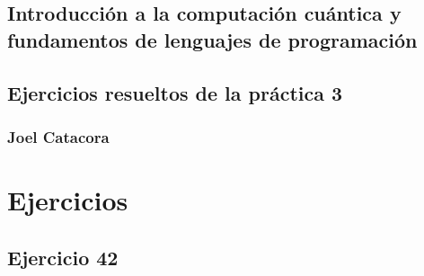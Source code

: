 \documentclass[a4paper,11pt]{article}
\title{}
\author{}
\begin{document}
\maketitle 

\thispagestyle{empty}
\begin{center}
\section*{Introducción a  la computación cuántica y fundamentos de lenguajes de programación} 
\subsection*{Ejercicios resueltos de la práctica 3}
\subsubsection*{Joel Catacora}

\end{center}

\newpage{\pagestyle{empty}\cleardoublepage}

\newpage

\section*
{Ejercicios}

\subsection*{Ejercicio 42}
\end{document}
